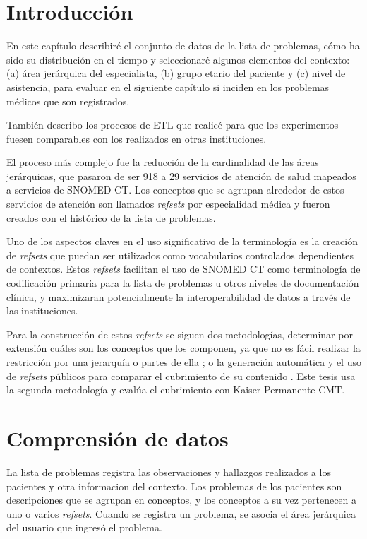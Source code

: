 \section{Introducción}
En este capítulo describiré el conjunto de datos de la lista de problemas, cómo ha sido su distribución en el tiempo y seleccionaré algunos elementos del contexto: (a) área jerárquica del especialista, (b) grupo etario del paciente y (c) nivel de asistencia, para evaluar en el siguiente capítulo si inciden en los problemas médicos que son registrados. 

También describo los procesos de ETL que realicé para que los experimentos fuesen comparables con los realizados en otras instituciones.

El proceso más complejo fue la reducción de la cardinalidad de las áreas jerárquicas, que pasaron de ser 918 a 29 servicios de atención de salud mapeados a servicios de SNOMED CT. Los conceptos que se agrupan alrededor de estos servicios de atención son llamados \textit{refsets} por especialidad médica y fueron creados con el histórico de la lista de problemas.

Uno de los aspectos claves en el uso significativo de la terminología es la creación de \textit{refsets} que puedan ser utilizados como vocabularios controlados dependientes de contextos. Estos \textit{refsets} facilitan el uso de SNOMED CT como terminología de codificación primaria para la lista de problemas u otros niveles de documentación clínica, y maximizaran potencialmente la interoperabilidad de datos a través de las instituciones\cite{Dolin2004KaiserTerminology.}.

Para la construcción de estos \textit{refsets} se siguen dos metodologías, determinar por extensión cuáles son los conceptos que los componen, ya que no es fácil realizar la restricción por una jerarquía o partes de ella \cite{Hjen2014MethodsSets.,Lee2013AImplementations.}; o la generación automática y el uso de \textit{refsets} públicos para comparar el cubrimiento de su contenido \cite{Lee2013AImplementations.}. Este tesis usa la segunda metodología y evalúa el cubrimiento con Kaiser Permanente CMT.

\section{Comprensión de datos}
La lista de problemas registra las observaciones y hallazgos realizados a los pacientes y otra informacion del contexto. Los problemas de los pacientes son descripciones que se agrupan en conceptos, y los conceptos a su vez pertenecen a uno o varios \textit{refsets}.
Cuando se registra un problema, se asocia el área jerárquica del usuario que ingresó el problema.

